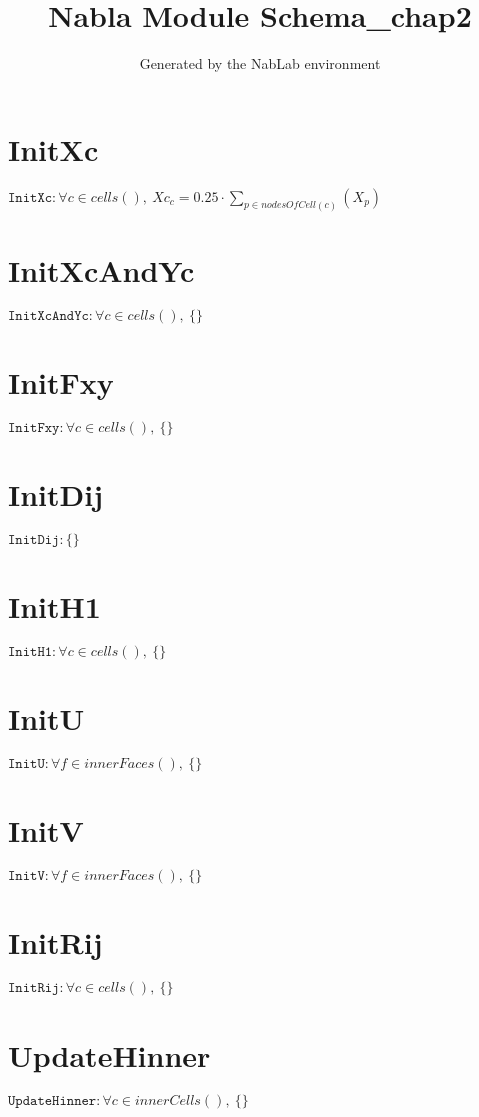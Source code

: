\documentclass[11pt]{article}
\title{Nabla Module Schema_chap2}
\author{Generated by the NabLab environment}
\begin{document}
\maketitle


\section{InitXc}
$\texttt{InitXc} : \forall{c\in cells()}, \ Xc_{c} = 0.25 \cdot \sum_{p\in nodesOfCell(c)}\left(X_{p}\right)$


\section{InitXcAndYc}
$\texttt{InitXcAndYc} : \forall{c\in cells()}, \ \{ \}$


\section{InitFxy}
$\texttt{InitFxy} : \forall{c\in cells()}, \ \{ \}$


\section{InitDij}
$\texttt{InitDij} : \{ \}$


\section{InitH1}
$\texttt{InitH1} : \forall{c\in cells()}, \ \{ \}$


\section{InitU}
$\texttt{InitU} : \forall{f\in innerFaces()}, \ \{ \}$


\section{InitV}
$\texttt{InitV} : \forall{f\in innerFaces()}, \ \{ \}$


\section{InitRij}
$\texttt{InitRij} : \forall{c\in cells()}, \ \{ \}$


\section{UpdateHinner}
$\texttt{UpdateHinner} : \forall{c\in innerCells()}, \ \{ \}$
\end{document}

